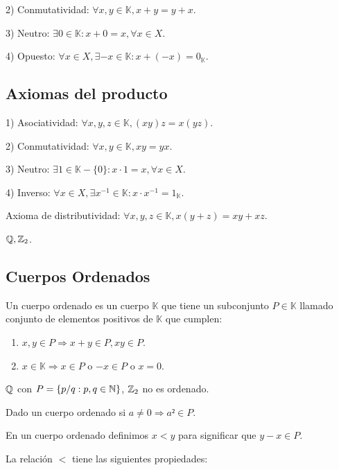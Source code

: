 2) Conmutatividad: $\forall x,y \in \mathbb{K}, x+y=y+x$.

3) Neutro: $\exists 0 \in \mathbb{K} :x+0 = x, \forall x \in X$.

4) Opuesto: $\forall x \in X, \exists -x \in \mathbb{K} : x +(-x) = 0_\mathbb{K}$.

\subsection{Axiomas del producto}

1) Asociatividad: $\forall x,y,z \in \mathbb{K}, (xy)z=x(yz)$.

2) Conmutatividad: $\forall x,y \in \mathbb{K}, xy=yx$.

3) Neutro: $\exists 1 \in \mathbb{K}-\{0\} :x \cdot 1 = x, \forall x \in X$.

4) Inverso: $\forall x \in X, \exists x^{-1} \in \mathbb{K} : x \cdot x^{-1} = 1_\mathbb{K}$.

Axioma de distributividad: $\forall x,y,z \in \mathbb{K}, x(y+z)=xy+xz$.

\begin{eg}
    $\mathbb{Q}, \mathbb{Z}_2$.
\end{eg}

\subsection{Cuerpos Ordenados}

Un cuerpo ordenado es un cuerpo $\mathbb{K}$ que tiene un subconjunto $P \in \mathbb{K}$ llamado conjunto de elementos positivos de $\mathbb{K}$ que cumplen:
\begin{enumerate}
    \item $x,y \in P \Rightarrow x+y \in P, xy \in P$.
    \item $x \in \mathbb{K} \Rightarrow x \in P$ o $-x \in P$ o $x=0$.
\end{enumerate}

\begin{eg}
    $\mathbb{Q}$ con $P = \{ p/q:p,q\in \mathbb{N} \}$, $\mathbb{Z}_2$ no es ordenado.
\end{eg}

\begin{prop}
    Dado un cuerpo ordenado si $a \neq 0 \Rightarrow a²\in P$.
\end{prop}

En un cuerpo ordenado definimos $x<y$ para significar que $y-x\in P$.

La relación $<$ tiene las siguientes propiedades:

